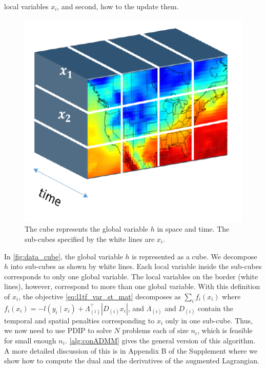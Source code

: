 \documentclass{article}
\newcommand{\given}{\;\vert\;}
\begin{document}
local variables $x_i$, and second, how to the update them.
\begin{figure}[tb]
  \centering
  \includegraphics[height=.13\textheight]{Figures/data_cube}
  \caption{The cube represents the global variable $h$ in space and
    time. The sub-cubes specified by the white lines are
    $x_i$.}
  \label{fig:data_cube}
\end{figure} 


In \autoref{fig:data_cube}, the global variable $h$ is represented
as a cube. We decompose $h$
into sub-cubes as shown by white lines. Each local variable inside the sub-cubes corresponds to only one global variable. The local variables on the border (white lines), however, correspond to more than one global variable. With
this definition of $x_i$, the objective
\eqref{eq:l1tf_var_st_mat} decomposes as $\sum_i f_i(x_i)$ where
$f_i(x_i)=-l(y_i\given x_i)+\Lambda_{(i)}^\top |D_{(i)}x_i|$, and
$\Lambda_{(i)}$ and $D_{(i)}$ contain the temporal and spatial
penalties corresponding to $x_i$ only in one sub-cube. Thus, we now need to use PDIP to solve $N$ problems each of size $n_i$, which is feasible for small enough $n_i$. \autoref{alg:conADMM} gives the general version of this algorithm. A more detailed discussion of this is in Appendix B of the Supplement where we show how to compute the dual and the derivatives of the augmented Lagrangian. 
\end{document}
